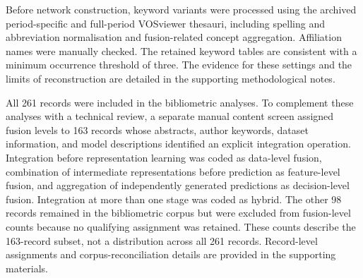 \documentclass[]{interact}
\theoremstyle{plain}%
\theoremstyle{definition}
\theoremstyle{remark}
\DeclareRobustCommand{\DIFadd}[1]{{\protect\color{DIFaddcolor}\uwave{#1}}}
\def\DIFadd#1{#1}%
\begin{document}
\DIFadd{Before} \DIFadd{network} \DIFadd{construction}\DIFadd{,} \DIFadd{keyword} \DIFadd{variants} \DIFadd{were} \DIFadd{processed} \DIFadd{using} \DIFadd{the} \DIFadd{archived} \DIFadd{period-specific} \DIFadd{and} \DIFadd{full-period} \DIFadd{VOSviewer} \DIFadd{thesauri}\DIFadd{,} \DIFadd{including} \DIFadd{spelling} \DIFadd{and} \DIFadd{abbreviation} \DIFadd{normalisation} \DIFadd{and} \DIFadd{fusion-related} \DIFadd{concept} \DIFadd{aggregation}\DIFadd{.} \DIFadd{Affiliation} \DIFadd{names} \DIFadd{were} \DIFadd{manually} \DIFadd{checked}\DIFadd{.} \DIFadd{The} \DIFadd{retained} \DIFadd{keyword} \DIFadd{tables} \DIFadd{are} \DIFadd{consistent} \DIFadd{with} \DIFadd{a} \DIFadd{minimum} \DIFadd{occurrence} \DIFadd{threshold} \DIFadd{of} \DIFadd{three}\DIFadd{.} \DIFadd{The} \DIFadd{evidence} \DIFadd{for} \DIFadd{these} \DIFadd{settings} \DIFadd{and} \DIFadd{the} \DIFadd{limits} \DIFadd{of} \DIFadd{reconstruction} \DIFadd{are} \DIFadd{detailed} \DIFadd{in} \DIFadd{the} \DIFadd{supporting} \DIFadd{methodological} \DIFadd{notes}\DIFadd{.}

\DIFadd{All} \DIFadd{261} \DIFadd{records} \DIFadd{were} \DIFadd{included} \DIFadd{in} \DIFadd{the} \DIFadd{bibliometric} \DIFadd{analyses}\DIFadd{.} \DIFadd{To} \DIFadd{complement} \DIFadd{these} \DIFadd{analyses} \DIFadd{with} \DIFadd{a} \DIFadd{technical} \DIFadd{review}\DIFadd{,} \DIFadd{a} \DIFadd{separate} \DIFadd{manual} \DIFadd{content} \DIFadd{screen} \DIFadd{assigned} \DIFadd{fusion} \DIFadd{levels} \DIFadd{to} \DIFadd{163} \DIFadd{records} \DIFadd{whose} \DIFadd{abstracts}\DIFadd{,} \DIFadd{author} \DIFadd{keywords}\DIFadd{,} \DIFadd{dataset} \DIFadd{information}\DIFadd{,} \DIFadd{and} \DIFadd{model} \DIFadd{descriptions} \DIFadd{identified} \DIFadd{an} \DIFadd{explicit} \DIFadd{integration} \DIFadd{operation}\DIFadd{.} \DIFadd{Integration} \DIFadd{before} \DIFadd{representation} \DIFadd{learning} \DIFadd{was} \DIFadd{coded} \DIFadd{as} \DIFadd{data-level} \DIFadd{fusion}\DIFadd{,} \DIFadd{combination} \DIFadd{of} \DIFadd{intermediate} \DIFadd{representations} \DIFadd{before} \DIFadd{prediction} \DIFadd{as} \DIFadd{feature-level} \DIFadd{fusion}\DIFadd{,} \DIFadd{and} \DIFadd{aggregation} \DIFadd{of} \DIFadd{independently} \DIFadd{generated} \DIFadd{predictions} \DIFadd{as} \DIFadd{decision-level} \DIFadd{fusion}\DIFadd{.} \DIFadd{Integration} \DIFadd{at} \DIFadd{more} \DIFadd{than} \DIFadd{one} \DIFadd{stage} \DIFadd{was} \DIFadd{coded} \DIFadd{as} \DIFadd{hybrid}\DIFadd{.} \DIFadd{The} \DIFadd{other} \DIFadd{98} \DIFadd{records} \DIFadd{remained} \DIFadd{in} \DIFadd{the} \DIFadd{bibliometric} \DIFadd{corpus} \DIFadd{but} \DIFadd{were} \DIFadd{excluded} \DIFadd{from} \DIFadd{fusion-level} \DIFadd{counts} \DIFadd{because} \DIFadd{no} \DIFadd{qualifying} \DIFadd{assignment} \DIFadd{was} \DIFadd{retained}\DIFadd{.} \DIFadd{These} \DIFadd{counts} \DIFadd{describe} \DIFadd{the} \DIFadd{163-record} \DIFadd{subset}\DIFadd{,} \DIFadd{not} \DIFadd{a} \DIFadd{distribution} \DIFadd{across} \DIFadd{all} \DIFadd{261} \DIFadd{records}\DIFadd{.} \DIFadd{Record-level} \DIFadd{assignments} \DIFadd{and} \DIFadd{corpus-reconciliation} \DIFadd{details} \DIFadd{are} \DIFadd{provided} \DIFadd{in} \DIFadd{the} \DIFadd{supporting} \DIFadd{materials}\DIFadd{.}
\end{document}

